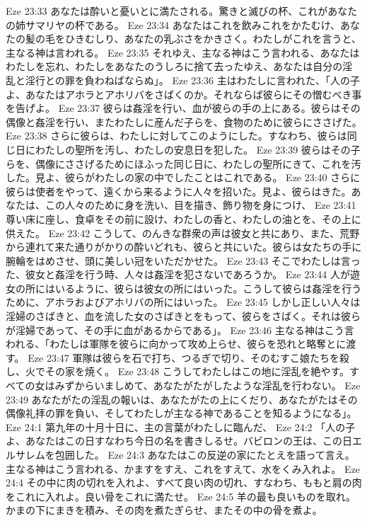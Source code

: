 Eze 23:33  あなたは酔いと憂いとに満たされる。驚きと滅びの杯、これがあなたの姉サマリヤの杯である。
Eze 23:34  あなたはこれを飲みこれをかたむけ、あなたの髪の毛をひきむしり、あなたの乳ぶさをかきさく。わたしがこれを言うと、主なる神は言われる。
Eze 23:35  それゆえ、主なる神はこう言われる、あなたはわたしを忘れ、わたしをあなたのうしろに捨て去ったゆえ、あなたは自分の淫乱と淫行との罪を負わねばならぬ」。
Eze 23:36  主はわたしに言われた、「人の子よ、あなたはアホラとアホリバをさばくのか。それならば彼らにその憎むべき事を告げよ。
Eze 23:37  彼らは姦淫を行い、血が彼らの手の上にある。彼らはその偶像と姦淫を行い、またわたしに産んだ子らを、食物のために彼らにささげた。
Eze 23:38  さらに彼らは、わたしに対してこのようにした。すなわち、彼らは同じ日にわたしの聖所を汚し、わたしの安息日を犯した。
Eze 23:39  彼らはその子らを、偶像にささげるためにほふった同じ日に、わたしの聖所にきて、これを汚した。見よ、彼らがわたしの家の中でしたことはこれである。
Eze 23:40  さらに彼らは使者をやって、遠くから来るように人々を招いた。見よ、彼らはきた。あなたは、この人々のために身を洗い、目を描き、飾り物を身につけ、
Eze 23:41  尊い床に座し、食卓をその前に設け、わたしの香と、わたしの油とを、その上に供えた。
Eze 23:42  こうして、のんきな群衆の声は彼女と共にあり、また、荒野から連れて来た通りがかりの酔いどれも、彼らと共にいた。彼らは女たちの手に腕輪をはめさせ、頭に美しい冠をいただかせた。
Eze 23:43  そこでわたしは言った、彼女と姦淫を行う時、人々は姦淫を犯さないであろうか。
Eze 23:44  人が遊女の所にはいるように、彼らは彼女の所にはいった。こうして彼らは姦淫を行うために、アホラおよびアホリバの所にはいった。
Eze 23:45  しかし正しい人々は淫婦のさばきと、血を流した女のさばきとをもって、彼らをさばく。それは彼らが淫婦であって、その手に血があるからである」。
Eze 23:46  主なる神はこう言われる、「わたしは軍隊を彼らに向かって攻め上らせ、彼らを恐れと略奪とに渡す。
Eze 23:47  軍隊は彼らを石で打ち、つるぎで切り、そのむすこ娘たちを殺し、火でその家を焼く。
Eze 23:48  こうしてわたしはこの地に淫乱を絶やす。すべての女はみずからいましめて、あなたがたがしたような淫乱を行わない。
Eze 23:49  あなたがたの淫乱の報いは、あなたがたの上にくだり、あなたがたはその偶像礼拝の罪を負い、そしてわたしが主なる神であることを知るようになる」。
Eze 24:1  第九年の十月十日に、主の言葉がわたしに臨んだ、
Eze 24:2  「人の子よ、あなたはこの日すなわち今日の名を書きしるせ。バビロンの王は、この日エルサレムを包囲した。
Eze 24:3  あなたはこの反逆の家にたとえを語って言え。主なる神はこう言われる、かますをすえ、これをすえて、水をくみ入れよ。
Eze 24:4  その中に肉の切れを入れよ、すべて良い肉の切れ、すなわち、ももと肩の肉をこれに入れよ。良い骨をこれに満たせ。
Eze 24:5  羊の最も良いものを取れ。かまの下にまきを積み、その肉を煮たぎらせ、またその中の骨を煮よ。
